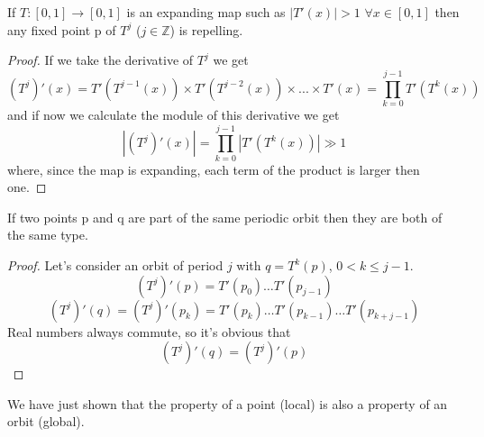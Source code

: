 \begin{prop}
    If $T : \left[0,1\right] \to \left[0,1\right]$ is an expanding map such as $\left\lvert T'\left(x\right)\right\rvert > 1$ $\forall x \in \left[0,1\right]$ then any fixed point p of $T^j$ ($j \in \mathbb{Z}$) is repelling.
\end{prop}
\begin{proof}
	If we take the derivative of $T^j$ we get
	$$
		(T^j)'(x) = T'(T^{j-1}(x))\times T'(T^{j-2}(x))\times...\times T'(x) = \prod_{k=0}^{j-1}T'\left(T^k\left(x\right)\right)
   $$
  	and if now we calculate the module of this derivative we get 
   $$
       \left\lvert\left(T^j\right)'\left(x\right)\right\rvert = \prod_{k=0}^{j-1}\left\lvert T'\left(T^k\left(x\right)\right)\right\rvert \gg 1
   $$
	where, since the map is expanding, each term of the product is larger then one.
\end{proof}
\begin{prop}
    If two points p and q are part of the same periodic orbit then they are both of the same type.
\end{prop}
\begin{proof}
    Let's consider an orbit of period $j$ with $q=T^k\left(p\right)$, $0 < k \leq j-1$.
    $$
        \left(T^j\right)'\left(p\right) = T'\left(p_0\right)\ldots T'\left(p_{j-1}\right)
    $$
    $$
        \left(T^j\right)'\left(q\right) = \left(T^j\right)'\left(p_k\right) = T'\left(p_k\right)\ldots T'\left(p_{k-1}\right) \ldots T'\left(p_{k+j-1}\right)
    $$
    Real numbers always commute, so it's obvious that
    $$
        \left(T^j\right)'\left(q\right) = \left(T^j\right)'\left(p\right)
    $$
\end{proof}
We have just shown that the property of a point (local) is also a property of an orbit (global).
